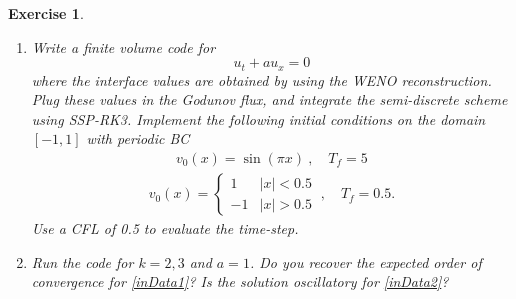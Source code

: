 \documentclass[10pt,letterpaper]{article}
\theoremstyle{break}
\newtheorem{exercise}{Exercise}
\begin{document}
\begin{exercise}
\begin{enumerate}
\item Write a finite volume code for
\[
u_t + au_x = 0
\]
where the interface values are obtained by using the WENO reconstruction. Plug these values in the Godunov flux, and integrate the semi-discrete scheme using SSP-RK3. Implement the following initial conditions on the domain $[-1,1]$ with periodic BC
\begin{gather} \label{inData1}
	v_0(x)=\sin(\pi x)\ ,  
	\quad
	T_f = 5
\end{gather}%
\begin{gather} \label{inData2}
	v_0(x)=\begin{cases}
		1 & |x|<0.5\\
		-1 & |x|>0.5
	\end{cases}\ ,
	\quad
	T_f = 0.5.
\end{gather}%
Use a CFL of 0.5 to evaluate the time-step. 

\item
Run the code for $k=2,3$ and $a=1$. Do you recover the expected order of convergence for \eqref{inData1}? Is the solution oscillatory for \eqref{inData2}?

\end{enumerate}

\end{exercise}
\end{document}
